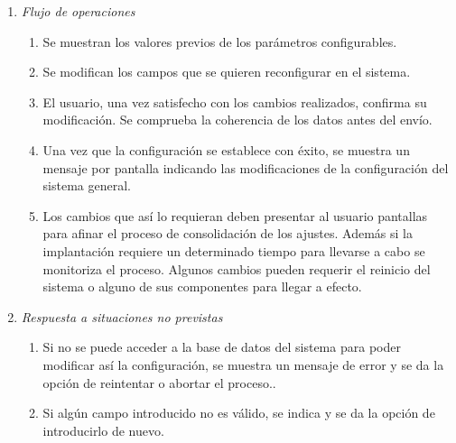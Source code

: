 \begin{enumerate}
		\item \textit{Flujo de operaciones}
		\begin{enumerate}
			\item Se muestran los valores previos de los parámetros configurables.
			\item Se modifican los campos que se quieren reconfigurar en el sistema.
			\item El usuario, una vez satisfecho con los cambios realizados, confirma su modificación. Se comprueba la coherencia de los datos antes del envío. 
			\item Una vez que la configuración se establece con éxito, se muestra un mensaje por pantalla indicando las modificaciones de la configuración del sistema general.
			\item Los cambios que así lo requieran deben presentar al usuario pantallas para afinar el proceso de consolidación de los ajustes. Además si la implantación requiere un determinado tiempo para llevarse a cabo se monitoriza el proceso. Algunos cambios pueden requerir el reinicio del sistema o alguno de sus componentes para llegar a efecto.
		\end{enumerate}
		\item \textit{Respuesta a situaciones no previstas}
		\begin{enumerate}
			\item Si no se puede acceder a la base de datos del sistema para poder modificar así la configuración, se muestra un mensaje de error y se da la opción de reintentar o abortar el proceso..
			\item Si algún campo introducido no es válido, se indica y se da la opción de introducirlo de nuevo.
		\end{enumerate}

	\end{enumerate}
